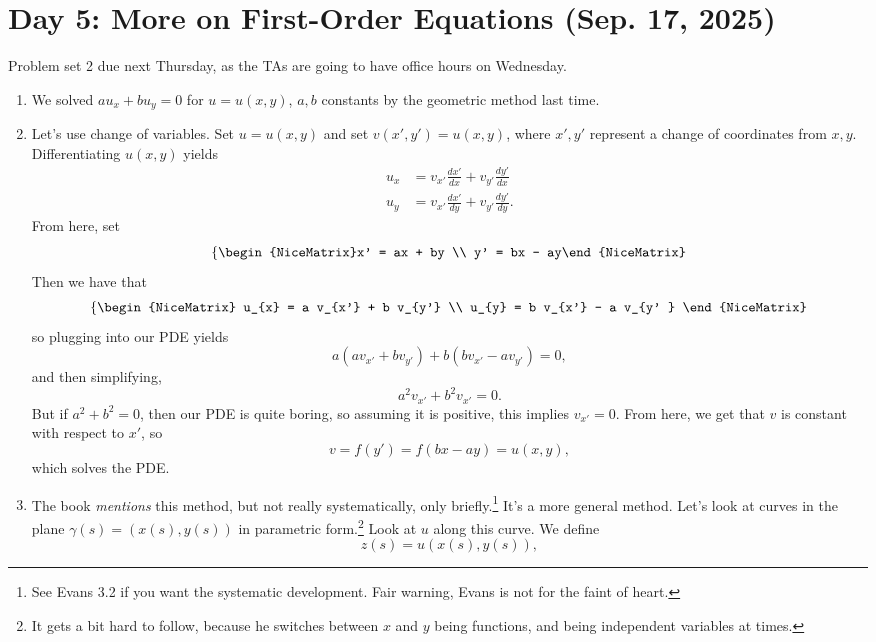 \section{Day 5: More on First-Order Equations (Sep. 17, 2025)}
Problem set 2 due next Thursday, as the TAs are going to have office hours on Wednesday.

\begin{enumerate}[(1)]

	\item We solved \( au_{x} + b u_{y} = 0 \) for \( u = u(x, y) \), \( a, b \) constants by the geometric method last time.
	\item Let's use change of variables. Set \( u = u(x, y) \) and set \( v(x', y') = u(x, y) \), where \( x', y' \) represent a change of coordinates from \( x, y \). Differentiating \( u(x, y) \) yields
		\begin{align*}
		u_{x} &= v_{x'} \frac{d x'}{dx} + v_{y' } \frac{dy' }{dx} \\
		u_{y} &= v_{x'} \frac{d x'}{dy} + v_{y' } \frac{dy' }{dy}.
		\end{align*}
		From here,  set
		\[ \left\{ \begin{NiceMatrix}x' = ax + by \\ y' = bx - ay\end{NiceMatrix}  \right. \]
		Then we have that
		\[\left\{ \begin{NiceMatrix}
		u_{x} = a v_{x'} + b v_{y'} \\
		u_{y} = b v_{x'} - a v_{y' }
	\end{NiceMatrix}  \right.\]
	so plugging into our PDE yields
	\[ a(a v_{x'} + bv_{y' }) + b(bv_{x' } - av_{y' }) = 0, \]
	and then simplifying,
	\[ a^{2} v_{x' } + b^{2} v_{x' } = 0. \]
	But if \( a^{2} + b^{2} = 0 \), then our PDE is quite boring, so assuming it is positive, this implies \( v_{x' } = 0 \). From here, we get that \( v \) is constant with respect to \( x' \), so
	\[ v = f(y') = f(bx-ay) = u(x, y), \]
	which solves the PDE.
\item The book \textit{mentions} this method, but not really systematically, only briefly.\footnote{See Evans 3.2 if you want the systematic development. Fair warning, Evans is not for the faint of heart.} It's a more general method.
	Let's look at curves in the plane \( \gamma(s) = (x(s), y(s)) \) in parametric form.\footnote{It gets a bit hard to follow, because he switches between \( x \) and \( y \) being functions, and being independent variables at times.} Look at \( u \) along this curve. We define
	\[ z(s) = u(x(s), y(s)), \]

\end{enumerate}
